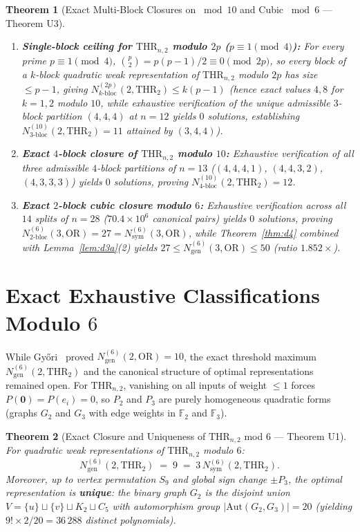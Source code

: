 \documentclass[11pt,a4paper]{article}
\newtheorem{theorem}{Theorem}[section]
\theoremstyle{definition}
\newcommand{\F}{\mathbb{F}}
\newcommand{\OR}{\mathrm{OR}}
\newcommand{\THR}{\mathrm{THR}}
\newcommand{\Nsym}{N_{\mathrm{sym}}}
\newcommand{\Ngen}{N_{\mathrm{gen}}}
\newcommand{\Ntwobloc}{N_{\mathrm{2\text{-}bloc}}}
\newcommand{\Aut}{\mathrm{Aut}}
\begin{document}
\begin{theorem}[Exact Multi-Block Closures on $\bmod 10$ and Cubic $\bmod 6$ --- Theorem U3]
\label{thm:u3}
\begin{enumerate}[leftmargin=*,nosep]
  \item \textbf{Single-block ceiling for $\THR_{n,2}$ modulo $2p$ ($p \equiv 1 \pmod 4$):} For every prime $p \equiv 1 \pmod 4$, $\binom{p}{2} = p(p-1)/2 \equiv 0 \pmod{2p}$, so every block of a $k$-block quadratic weak representation of $\THR_{n,2}$ modulo $2p$ has size $\le p - 1$, giving $N_{k\text{-bloc}}^{(2p)}(2, \THR_2) \le k(p - 1)$ (hence exact values $4, 8$ for $k = 1, 2$ modulo $10$, while exhaustive verification of the unique admissible $3$-block partition $(4,4,4)$ at $n = 12$ yields $0$ solutions, establishing $N_{3\text{-bloc}}^{(10)}(2, \THR_2) = 11$ attained by $(3,4,4)$).
  \item \textbf{Exact $4$-block closure of $\THR_{n,2}$ modulo $10$:} Exhaustive verification of all three admissible $4$-block partitions of $n = 13$ ($(4,4,4,1)$, $(4,4,3,2)$, $(4,3,3,3)$) yields $0$ solutions, proving $N_{4\text{-bloc}}^{(10)}(2, \THR_2) = 12$.
  \item \textbf{Exact $2$-block cubic closure modulo $6$:} Exhaustive verification across all $14$ splits of $n = 28$ ($70.4 \times 10^6$ canonical pairs) yields $0$ solutions, proving $\Ntwobloc^{(6)}(3, \OR) = 27 = \Nsym^{(6)}(3, \OR)$, while Theorem~\ref{thm:d4} combined with Lemma~\ref{lem:d3a}(2) yields $27 \le \Ngen^{(6)}(3, \OR) \le 50$ (ratio $1.852\times$).
\end{enumerate}
\end{theorem}

\section{Exact Exhaustive Classifications Modulo $6$}
\label{sec:exact6}

While Gy{\H{o}}ri~\cite{Gyo07} proved $\Ngen^{(6)}(2, \OR) = 10$, the exact threshold maximum $\Ngen^{(6)}(2, \THR_2)$ and the canonical structure of optimal representations remained open. For $\THR_{n,2}$, vanishing on all inputs of weight $\le 1$ forces $P(\mathbf{0}) = P(e_i) = 0$, so $P_2$ and $P_3$ are purely homogeneous quadratic forms (graphs $G_2$ and $G_3$ with edge weights in $\F_2$ and $\F_3$).

\begin{theorem}[Exact Closure and Uniqueness of $\THR_{n,2}$ mod $6$ --- Theorem U1]
\label{thm:u1}
For quadratic weak representations of $\THR_{n,2}$ modulo $6$:
\[
  \Ngen^{(6)}(2, \THR_2) \;=\; 9 \;=\; 3\,\Nsym^{(6)}(2, \THR_2).
\]
Moreover, up to vertex permutation $S_9$ and global sign change $\pm P_3$, the optimal representation is \textbf{unique}: the binary graph $G_2$ is the disjoint union $V = \{u\} \sqcup \{v\} \sqcup K_2 \sqcup C_5$ with automorphism group $|\Aut(G_2, G_3)| = 20$ (yielding $9! \times 2 / 20 = 36\,288$ distinct polynomials).
\end{theorem}
\end{document}
